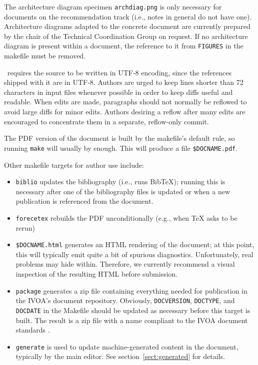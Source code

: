 \documentclass[11pt,a4paper]{ivoa}
\newcommand{\BibTeX}{BibTeX}
\begin{document}
The architecture diagram specimen \texttt{archdiag.png} is only
necessary for documents on the recommendation track (i.e., notes in
general do not have one).  Architecture diagrams adapted to the concrete
document are currently prepared by the chair of the Technical
Coordination Group on request.  If no architecture diagram is present
within a document, the reference to it from \texttt{FIGURES} in the
makefile must be removed.

\ivoatex\ requires the source to be written in UTF-8 encoding, since the
references shipped with it are in UTF-8.
Authors are urged to keep lines shorter than 72 characters in input
files whenever possible in order to keep diffs useful and readable.
When edits are made, paragraphs should not normally be reflowed to avoid
large diffs for minor edits.  Authors desiring a reflow after many edits
are encouraged to concentrate them in a separate, reflow-only commit.

The PDF version of the document is built by the makefile's default rule,
so running \texttt{make} will usually by enough.  This will produce a
file \texttt{\$DOCNAME.pdf}.

Other makefile targets for author use include:

\begin{itemize}
\item \texttt{biblio} updates the bibliography (i.e., runs \BibTeX);
running this is necessary after one of the bibliography files is updated
or when a new publication is referenced from the document.
\item \texttt{forecetex} rebuilds the PDF unconditionally (e.g., when TeX
asks to be rerun)
\item \texttt{\$DOCNAME.html} generates an HTML rendering of the
document; at this point, this will typically emit quite a bit of
spurious diagnostics.  Unfortunately, real problems may hide within.  
Therefore, we currently recommend a visual inspection of the resulting
HTML before submission.
\item \texttt{package} generates a zip file containing everything needed
for publication in the IVOA's document repository.   Obviously, 
\texttt{DOCVERSION}, \texttt{DOCTYPE}, and \texttt{DOCDATE} in the
Makefile should be updated as necessary before this target is built.
The result is a zip file with a name compliant to the IVOA document
standards \citep{std:docSTD}.
\item \texttt{generate} is used to update machine-generated content in
the document, typically by the main editor.  See
section~\ref{sect:generated} for details.
\end{itemize}
\end{document}
